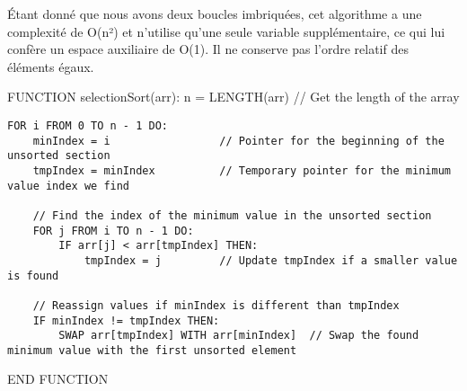 \documentclass[11pt]{article}
\begin{document}
Étant donné que nous avons deux boucles imbriquées, cet algorithme a une
complexité de O(n²) et n'utilise qu'une seule variable supplémentaire,
ce qui lui confère un espace auxiliaire de O(1). Il ne conserve pas
l'ordre relatif des éléments égaux.

    FUNCTION selectionSort(arr): n = LENGTH(arr) // Get the length of the
array

\begin{verbatim}
FOR i FROM 0 TO n - 1 DO:
    minIndex = i                 // Pointer for the beginning of the unsorted section
    tmpIndex = minIndex          // Temporary pointer for the minimum value index we find

    // Find the index of the minimum value in the unsorted section
    FOR j FROM i TO n - 1 DO:
        IF arr[j] < arr[tmpIndex] THEN:
            tmpIndex = j         // Update tmpIndex if a smaller value is found

    // Reassign values if minIndex is different than tmpIndex
    IF minIndex != tmpIndex THEN:
        SWAP arr[tmpIndex] WITH arr[minIndex]  // Swap the found minimum value with the first unsorted element
\end{verbatim}

END FUNCTION
\end{document}
